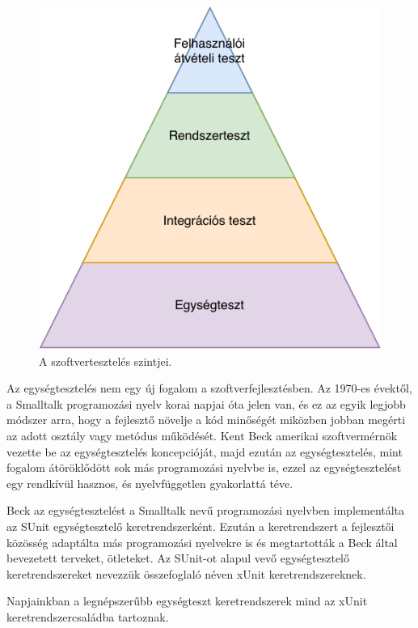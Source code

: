 \begin{figure}[h]
    \centering
    \includegraphics{images/software_testing_levels.pdf}
    \caption{A szoftvertesztelés szintjei.}
    \label{fig:software_testing_levels}
\end{figure}

Az egységtesztelés nem egy új fogalom a szoftverfejlesztésben. Az 1970-es évektől, a Smalltalk programozási nyelv korai napjai óta jelen van, és ez az egyik legjobb módszer arra, hogy a fejlesztő növelje a kód minőségét miközben jobban megérti az adott osztály vagy metódus működését. Kent Beck amerikai szoftvermérnök vezette be az egységtesztelés koncepcióját, majd ezután az egységtesztelés, mint fogalom átöröklődött sok más programozási nyelvbe is, ezzel az egységtesztelést egy rendkívül hasznos, és nyelvfüggetlen gyakorlattá téve. \cite{osherove_2013_the-art-of-unit-testing}

Beck az egységtesztelést a Smalltalk nevű programozási nyelvben implementálta az SUnit egységtesztelő keretrendszerként. \cite{beck_1999_guide-to-better-smalltalk} Ezután a keretrendszert a fejlesztői közösség adaptálta más programozási nyelvekre is és megtartották a Beck által bevezetett terveket, ötleteket. Az SUnit-ot alapul vevő egységtesztelő keretrendszereket nevezzük összefoglaló néven xUnit keretrendszereknek. \cite{fowler_2006_xunit}

Napjainkban a legnépszerűbb egységteszt keretrendszerek mind az xUnit keretrendszercsaládba tartoznak.


